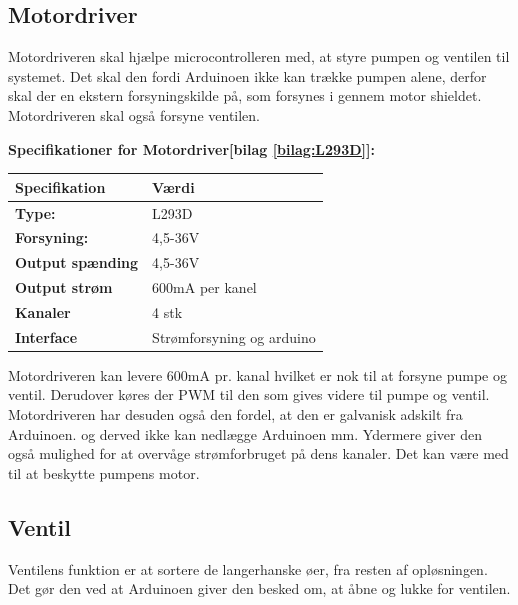 \subsection{Motordriver}
Motordriveren skal hjælpe microcontrolleren med, at styre pumpen og ventilen til systemet. Det skal den fordi Arduinoen ikke kan trække pumpen alene, derfor skal der en ekstern forsyningskilde på, som forsynes i gennem motor shieldet. Motordriveren skal også forsyne ventilen. 

 \textbf{Specifikationer for Motordriver[bilag \ref{bilag:L293D}]:} 
\begin{center}
		\begin{longtable}{ | m{6.5cm} | m{6.5cm}| } 
			\hline
			\textbf{Specifikation} &\textbf{Værdi} \\ 
			\hline
			\textbf{Type:} & L293D \\ 
			\hline
			\textbf{Forsyning:} &  4,5-36V \\ 
			\hline
			\textbf{Output spænding} & 4,5-36V  \\ 
			\hline		
			\textbf{Output strøm} & 600mA per kanel  \\ 
			\hline	
			\textbf{Kanaler} & 4 stk  \\ 
			\hline	
			\textbf{Interface} & Strømforsyning og arduino  \\ 
			\hline	
		\end{longtable}
\end{center}
Motordriveren kan levere 600mA pr. kanal hvilket er nok til at forsyne pumpe og ventil. Derudover køres der PWM til den som gives videre til pumpe og ventil. Motordriveren har desuden også den fordel, at den er galvanisk adskilt fra Arduinoen. og derved ikke kan nedlægge Arduinoen mm. Ydermere giver den også mulighed for at overvåge strømforbruget på dens kanaler. Det kan være med til at beskytte pumpens motor.


\subsection{Ventil}
Ventilens funktion er at sortere de langerhanske øer, fra resten af opløsningen. Det gør den ved at Arduinoen giver den besked om, at åbne og lukke for ventilen.

